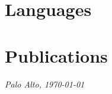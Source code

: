\documentclass[11pt,a4paper,sans]{moderncv} %
\begin{document}
\section{Languages}



\section{Publications}




%
%
%
%
%
\vspace{1em}
\begin{flushright}
\textit{Palo Alto, \today}
\end{flushright}
\end{document}
